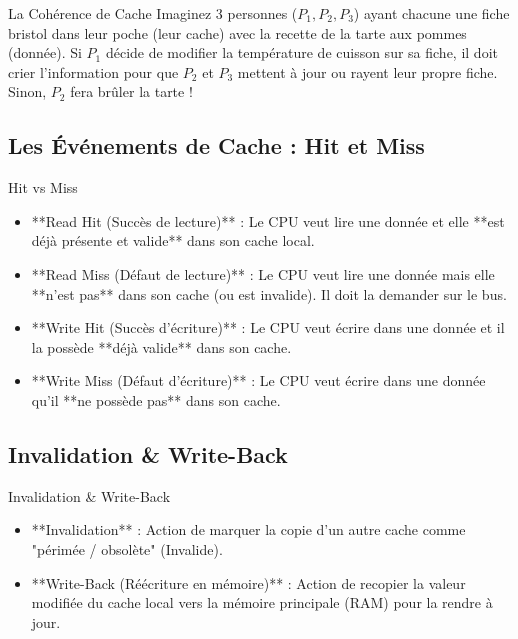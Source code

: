 \documentclass[12pt,a4paper]{article}
\begin{document}
\begin{analogybox}{La Cohérence de Cache}
Imaginez 3 personnes ($P_1, P_2, P_3$) ayant chacune une fiche bristol dans leur poche (leur cache) avec la recette de la tarte aux pommes (donnée). Si $P_1$ décide de modifier la température de cuisson sur sa fiche, il doit crier l'information pour que $P_2$ et $P_3$ mettent à jour ou rayent leur propre fiche. Sinon, $P_2$ fera brûler la tarte !
\end{analogybox}

\subsection{Les Événements de Cache : Hit et Miss}
\begin{definitionbox}{Hit vs Miss}
\begin{itemize}
    \item **Read Hit (Succès de lecture)** : Le CPU veut lire une donnée et elle **est déjà présente et valide** dans son cache local.
    \item **Read Miss (Défaut de lecture)** : Le CPU veut lire une donnée mais elle **n'est pas** dans son cache (ou est invalide). Il doit la demander sur le bus.
    \item **Write Hit (Succès d'écriture)** : Le CPU veut écrire dans une donnée et il la possède **déjà valide** dans son cache.
    \item **Write Miss (Défaut d'écriture)** : Le CPU veut écrire dans une donnée qu'il **ne possède pas** dans son cache.
\end{itemize}
\end{definitionbox}

\subsection{Invalidation \& Write-Back}
\begin{definitionbox}{Invalidation \& Write-Back}
\begin{itemize}
    \item **Invalidation** : Action de marquer la copie d'un autre cache comme "périmée / obsolète" (Invalide).
    \item **Write-Back (Réécriture en mémoire)** : Action de recopier la valeur modifiée du cache local vers la mémoire principale (RAM) pour la rendre à jour.
\end{itemize}
\end{definitionbox}
\end{document}
